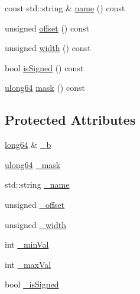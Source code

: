 \begin{DoxyCompactItemize}
\item 
const std::string \& \hyperlink{class_d_d4hep_1_1_d_d_segmentation_1_1_bit_field_value_a7c3d9380d0271421162b597fbe519a49}{name} () const 
\item 
unsigned \hyperlink{class_d_d4hep_1_1_d_d_segmentation_1_1_bit_field_value_a52d8af6f5001a14f1259d1cd4bc40497}{offset} () const 
\item 
unsigned \hyperlink{class_d_d4hep_1_1_d_d_segmentation_1_1_bit_field_value_a25b81e6bb05d7e62bd39e5dcf14a1ad4}{width} () const 
\item 
bool \hyperlink{class_d_d4hep_1_1_d_d_segmentation_1_1_bit_field_value_a534995affb4726f721e8bc773fc249d3}{isSigned} () const 
\item 
\hyperlink{namespace_d_d4hep_a7a8348d075fd0a3bafc06de7cde7a750}{ulong64} \hyperlink{class_d_d4hep_1_1_d_d_segmentation_1_1_bit_field_value_af4b2ade5782da7a6a67ca5cbeae05e95}{mask} () const 
\end{DoxyCompactItemize}
\subsection*{Protected Attributes}
\begin{DoxyCompactItemize}
\item 
\hyperlink{namespace_d_d4hep_ac2a70e722b33dc7ddaa20db8954ac836}{long64} \& \hyperlink{class_d_d4hep_1_1_d_d_segmentation_1_1_bit_field_value_a0105c82bf79092f583b6c88f2e34267a}{\_\-b}
\item 
\hyperlink{namespace_d_d4hep_a7a8348d075fd0a3bafc06de7cde7a750}{ulong64} \hyperlink{class_d_d4hep_1_1_d_d_segmentation_1_1_bit_field_value_a26159ffbb10cef7fa2ed73f9db058465}{\_\-mask}
\item 
std::string \hyperlink{class_d_d4hep_1_1_d_d_segmentation_1_1_bit_field_value_a0fe0475b6dcbe318bcba73096a20eb2f}{\_\-name}
\item 
unsigned \hyperlink{class_d_d4hep_1_1_d_d_segmentation_1_1_bit_field_value_aaec5eef97c6b194e309a3467fedb391c}{\_\-offset}
\item 
unsigned \hyperlink{class_d_d4hep_1_1_d_d_segmentation_1_1_bit_field_value_afe3513613815254bce43b62ef21b9f20}{\_\-width}
\item 
int \hyperlink{class_d_d4hep_1_1_d_d_segmentation_1_1_bit_field_value_a3e346b329d28bc181bde2f9475b6e1bd}{\_\-minVal}
\item 
int \hyperlink{class_d_d4hep_1_1_d_d_segmentation_1_1_bit_field_value_acc0f6833b9cf96123403bd90f7f70823}{\_\-maxVal}
\item 
bool \hyperlink{class_d_d4hep_1_1_d_d_segmentation_1_1_bit_field_value_a22e42eb6cbef6b643840f09dccac5f42}{\_\-isSigned}
\end{DoxyCompactItemize}


